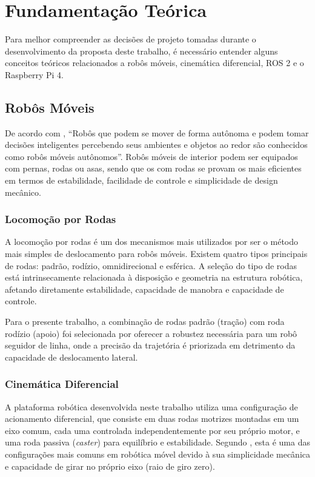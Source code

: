 \chapter{Fundamentação Teórica}

Para melhor compreender as decisões de projeto tomadas durante o desenvolvimento da proposta deste trabalho, é necessário entender alguns conceitos teóricos relacionados a robôs móveis, cinemática diferencial, ROS 2 e o Raspberry Pi 4.


\section{Robôs Móveis}

De acordo com , ``Robôs que podem se mover de forma autônoma e podem tomar decisões inteligentes percebendo seus ambientes e objetos ao redor são conhecidos como robôs móveis autônomos''. Robôs móveis de interior podem ser equipados com pernas, rodas ou asas, sendo que os com rodas se provam os mais eficientes em termos de estabilidade, facilidade de controle e simplicidade de design mecânico.


\subsection{Locomoção por Rodas}

A locomoção por rodas é um dos mecanismos mais utilizados por ser o método mais simples de deslocamento para robôs móveis. Existem quatro tipos principais de rodas: padrão, rodízio, omnidirecional e esférica. A seleção do tipo de rodas está intrinsecamente relacionada à disposição e geometria na estrutura robótica, afetando diretamente estabilidade, capacidade de manobra e capacidade de controle.

Para o presente trabalho, a combinação de rodas padrão (tração) com roda rodízio (apoio) foi selecionada por oferecer a robustez necessária para um robô seguidor de linha, onde a precisão da trajetória é priorizada em detrimento da capacidade de deslocamento lateral.


\subsection{Cinemática Diferencial}

A plataforma robótica desenvolvida neste trabalho utiliza uma configuração de acionamento diferencial, que consiste em duas rodas motrizes montadas em um eixo comum, cada uma controlada independentemente por seu próprio motor, e uma roda passiva (\textit{caster}) para equilíbrio e estabilidade. Segundo , esta é uma das configurações mais comuns em robótica móvel devido à sua simplicidade mecânica e capacidade de girar no próprio eixo (raio de giro zero).

